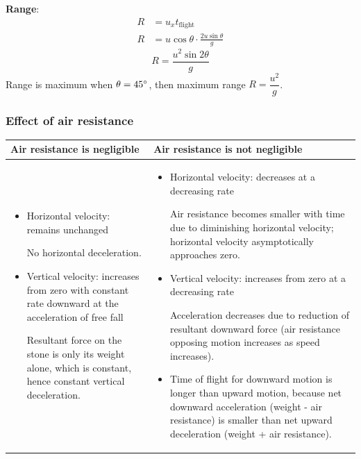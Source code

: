 \textbf{Range}:
\begin{align*}
R &= u_x t_{\text{flight}} \\
R &= u \cos \theta \cdot \frac{2u \sin \theta}{g}
\end{align*}
\[ \boxed{R = \frac{u^2 \sin 2\theta}{g}} \]
Range is maximum when $\theta = 45\degree$, then maximum range $R = \dfrac{u^2}{g}$.
\pagebreak

\subsubsection{Effect of air resistance}
\begin{table}[H]
\centering
\begin{tabular}{p{}p{}}
\hline\hline
Air resistance is negligible & Air resistance is not negligible \\
\hline
\begin{itemize}
\item Horizontal velocity: remains unchanged

No horizontal deceleration.

\item Vertical velocity: increases from zero with constant rate downward at the acceleration of free fall

Resultant force on the stone is only its weight alone, which is constant, hence constant vertical deceleration.
\end{itemize} & 
\begin{itemize}
\item Horizontal velocity: decreases at a decreasing rate

Air resistance becomes smaller with time due to diminishing horizontal velocity; horizontal velocity asymptotically approaches zero.

\item Vertical velocity: increases from zero at a decreasing rate

Acceleration decreases due to reduction of resultant downward force (air resistance opposing motion increases as speed increases).

\item Time of flight for downward motion is longer than upward motion, because net downward acceleration (weight - air resistance) is smaller than net upward deceleration (weight + air resistance).
\end{itemize} \\
\hline\hline
\end{tabular}
\end{table}


